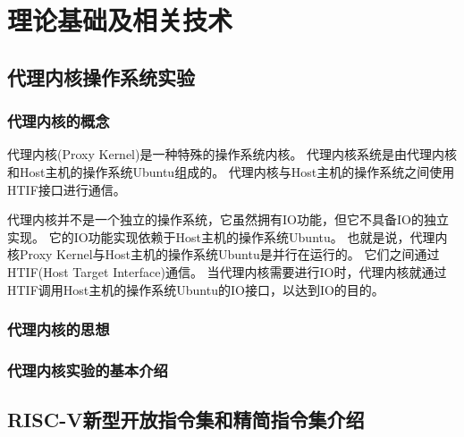 %
%
%
%
%
%

\chapter{理论基础及相关技术}

\section{代理内核操作系统实验}

\subsection{代理内核的概念}

代理内核(Proxy Kernel)是一种特殊的操作系统内核。
代理内核系统是由代理内核和Host主机的操作系统Ubuntu组成的。
代理内核与Host主机的操作系统之间使用HTIF接口进行通信。

代理内核并不是一个独立的操作系统，它虽然拥有IO功能，但它不具备IO的独立实现。
它的IO功能实现依赖于Host主机的操作系统Ubuntu。
也就是说，代理内核Proxy Kernel与Host主机的操作系统Ubuntu是并行在运行的。
它们之间通过HTIF(Host Target Interface)通信。
当代理内核需要进行IO时，代理内核就通过HTIF调用Host主机的操作系统Ubuntu的IO接口，以达到IO的目的。

\subsection{代理内核的思想}

\subsection{代理内核实验的基本介绍}

\section{RISC-V新型开放指令集和精简指令集介绍}

